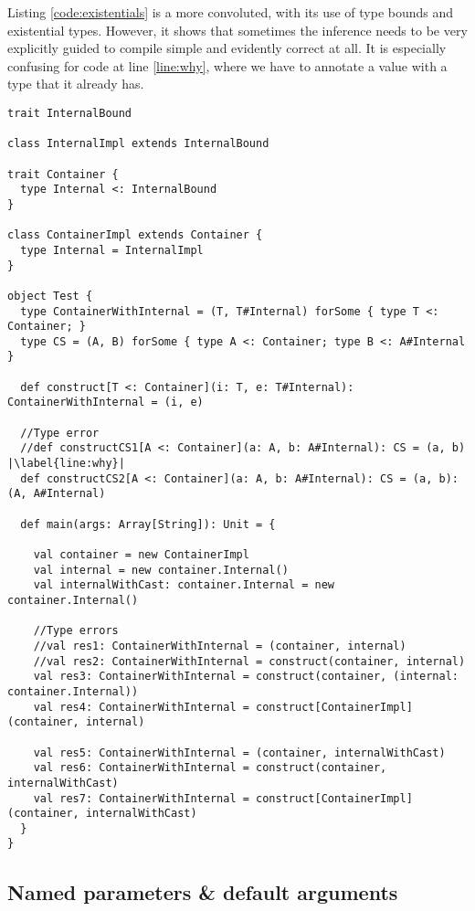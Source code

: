 Listing \ref{code:existentials} is a more convoluted, with its use of type bounds and existential types. However, it shows that sometimes the inference needs to be very explicitly guided to compile simple and evidently correct at all. It is especially confusing for code at line \ref{line:why}, where we have to annotate a value with a type that it already has.


\begin{lstlisting}[caption=Existential inference, label=code:existentials, escapechar=|, float, floatplacement=H]
trait InternalBound

class InternalImpl extends InternalBound

trait Container {
  type Internal <: InternalBound
}

class ContainerImpl extends Container {
  type Internal = InternalImpl
}

object Test {
  type ContainerWithInternal = (T, T#Internal) forSome { type T <: Container; }
  type CS = (A, B) forSome { type A <: Container; type B <: A#Internal }

  def construct[T <: Container](i: T, e: T#Internal): ContainerWithInternal = (i, e)

  //Type error
  //def constructCS1[A <: Container](a: A, b: A#Internal): CS = (a, b) |\label{line:why}|
  def constructCS2[A <: Container](a: A, b: A#Internal): CS = (a, b): (A, A#Internal)

  def main(args: Array[String]): Unit = {

    val container = new ContainerImpl
    val internal = new container.Internal()
    val internalWithCast: container.Internal = new container.Internal()

    //Type errors
    //val res1: ContainerWithInternal = (container, internal)
    //val res2: ContainerWithInternal = construct(container, internal)
    val res3: ContainerWithInternal = construct(container, (internal: container.Internal))
    val res4: ContainerWithInternal = construct[ContainerImpl](container, internal)

    val res5: ContainerWithInternal = (container, internalWithCast)
    val res6: ContainerWithInternal = construct(container, internalWithCast)
    val res7: ContainerWithInternal = construct[ContainerImpl](container, internalWithCast)
  }
}
\end{lstlisting}

\subsection{Named parameters \& default arguments}

